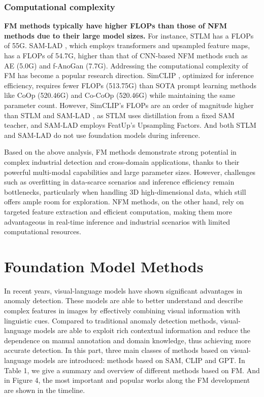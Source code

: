 \documentclass[journal,comsoc]{IEEEtran}
\begin{document}
\subsubsection{Computational complexity}
\textbf{FM methods typically have higher FLOPs than those of NFM methods due to their large model sizes.} For instance, STLM \cite{li2024sam} has a FLOPs of 55G. SAM-LAD  \cite{peng2024sam}, which employs transformers and upsampled feature maps, has a FLOPs of 54.7G, higher than that of CNN-based NFM methods such as AE \cite{bergmann2018improving}(5.0G) and f-AnoGan \cite{schlegl2019f}(7.7G). Addressing the computational complexity of FM has become a popular research direction. SimCLIP \cite{deng2024simclip}, optimized for inference efficiency, requires fewer FLOPs (513.75G) than SOTA prompt learning methods like CoOp \cite{zhou2022learning}(520.46G) and Co-CoOp \cite{zhou2022conditional}(520.46G) while maintaining the same parameter count. However, SimCLIP’s \cite{deng2024simclip} FLOPs are an order of magnitude higher than STLM \cite{li2024sam} and SAM-LAD \cite{peng2024sam}, as STLM \cite{li2024sam} uses distillation from a fixed SAM teacher, and SAM-LAD \cite{peng2024sam} employs FeatUp’s \cite{fu2024featup} Upsampling Factors. And both STLM \cite{li2024sam} and SAM-LAD \cite{peng2024sam} do not use foundation models during inference.

Based on the above analysis, FM methods demonstrate strong potential in complex industrial detection and cross-domain applications, thanks to their powerful multi-modal capabilities and large parameter sizes. However, challenges such as overfitting in data-scarce scenarios and inference efficiency remain bottlenecks, particularly when handling 3D high-dimensional data, which still offers ample room for exploration. NFM methods, on the other hand, rely on targeted feature extraction and efficient computation, making them more advantageous in real-time inference and industrial scenarios with limited computational resources.


\section{Foundation Model Methods}

In recent years, visual-language models have shown significant advantages in anomaly detection. These models are able to better understand and describe complex features in images by effectively combining visual information with linguistic cues. Compared to traditional anomaly detection methods, visual-language models are able to exploit rich contextual information and reduce the dependence on manual annotation and domain knowledge, thus achieving more accurate detection. In this part, three main classes of methods based on visual- language models are introduced: methods based on SAM, CLIP and GPT. In Table 1, we give a summary and overview of different
methods based on FM. And in Figure 4, the most important and popular works along the FM development are shown in the timeline.
\end{document}
